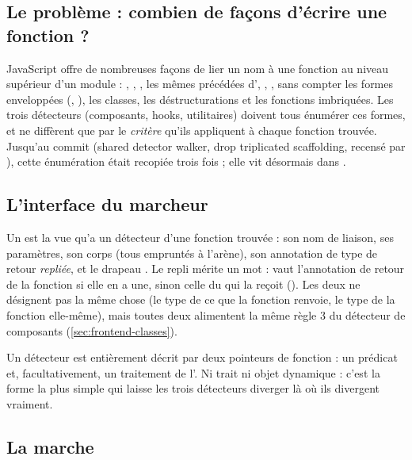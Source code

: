 \subsection{Le problème : combien de façons d'écrire une fonction ?}

JavaScript offre de nombreuses façons de lier un nom à une fonction au niveau supérieur d'un module : , , , les mêmes précédées d', , , sans compter les formes enveloppées (, ), les classes, les déstructurations et les fonctions imbriquées. Les trois détecteurs (composants, hooks, utilitaires) doivent tous énumérer ces formes, et ne diffèrent que par le \emph{critère} qu'ils appliquent à chaque fonction trouvée. Jusqu'au commit  (\og shared detector walker, drop triplicated scaffolding\fg{}, recensé par ), cette énumération était recopiée trois fois ; elle vit désormais dans .

\subsection{L'interface du marcheur}


Un  est la vue qu'a un détecteur d'une fonction trouvée : son nom de liaison, ses paramètres, son corps (tous empruntés à l'arène), son annotation de type de retour \emph{repliée}, et le drapeau . Le repli mérite un mot :  vaut l'annotation de retour de la fonction si elle en a une, sinon celle du  qui la reçoit (). Les deux ne désignent pas la même chose (le type de ce que la fonction renvoie, le type de la fonction elle-même), mais toutes deux alimentent la même règle 3 du détecteur de composants (\cref{sec:frontend-classes}).

Un détecteur est entièrement décrit par deux pointeurs de fonction : un prédicat  et, facultativement, un traitement de l'. Ni trait ni objet dynamique : c'est la forme la plus simple qui laisse les trois détecteurs diverger là où ils divergent vraiment.

\subsection{La marche}


